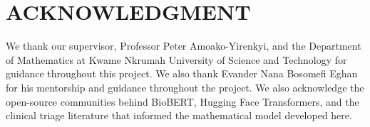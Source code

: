 \chapter*{ACKNOWLEDGMENT}

We thank our supervisor, Professor Peter Amoako-Yirenkyi, and the Department of Mathematics at Kwame Nkrumah University of Science and Technology for guidance throughout this project. We also thank Evander Nana Bosomefi Eghan for his mentorship and guidance throughout the project. We also acknowledge the open-source communities behind BioBERT, Hugging Face Transformers, and the clinical triage literature that informed the mathematical model developed here.
